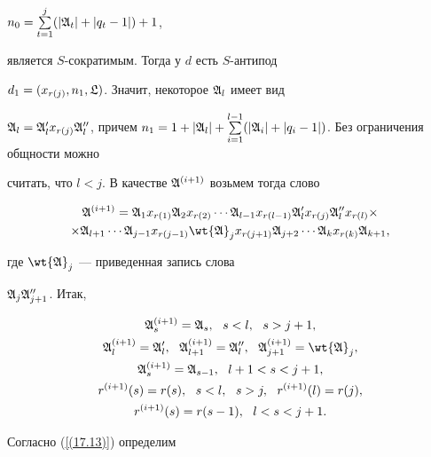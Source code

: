 $n_0=\sum\limits_{t=1}^j(|\frak A_t|+|q_t-1|)+1$,


является $S$-сократимым. Тогда у $d$ есть $S$-антипод


$d_1=(x_{r(j)},n_1,\frak L)$. Значит, некоторое $\frak A_l$ имеет вид


$\frak A_l=\frak A'_l x_{r(j)}\frak A''_l$, причем $n_1=1+|\frak A_l|+


\sum\limits^{l-1}_{i=1}(|\frak A_i| +|q_i-1|)$. Без ограничения общности можно 


считать, что $l<j$. В качестве $\frak A^{{(i+1)}}$ возьмем тогда слово


\begin{multline}


\frak A^{(i+1)}=\frak A_1 x_{r(1)}\frak A_2x_{r(2)}\dotsb


\frak A_{l-1}x_{r(l-1)}\frak A_l' x_{r(j)}\frak A''_l x_{r(l)}\times \\


\times\frak A_{l+1}\dotsb\frak A_{j-1} x_{r(j-1)}\wt{\frak A}_j


x_{r(j+1)}\frak A_{j+2}\dotsb\frak A_k x_{r(k)}\frak A_{k+1},


\label{(17.12)}


\end{multline}


где $\wt{\frak A}_j$ --- приведенная запись слова


$\frak A_j\frak A''_{j +1}$. Итак,


\begin{gather}


\frak A^{(i+1)}_s=\frak A_s,\ \ s<l,\ \ s>j+1,\notag\\


\frak A^{(i+1)}_l=\frak A'_l,\ \ \frak A^{(i+1)}_{l+1}=\frak A''_l,


\ \ \frak A^{(i+1)}_{j+1}=\wt{\frak A}_j,


\label{(17.13)}\\


\frak A^{(i+1)}_s=\frak A_{s-1},\ \ l+1<s<j+1,\notag \\


r^{(i+1)}(s)=r(s),\ \ s<l,\ \ s>j,\ \ r^{(i+1)}(l)=r(j),


\label{(17.14)} \\


r^{(i+1)}(s)=r(s-1),\ \ l<s<j+1. \notag


\end{gather}


Согласно (\ref{(17.13)}) определим


